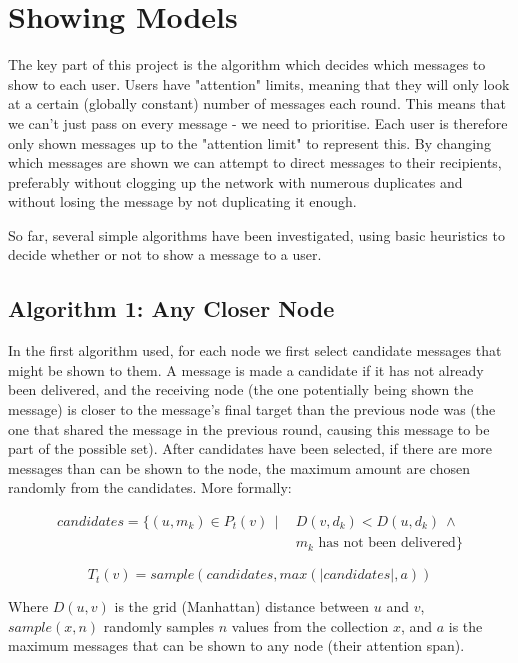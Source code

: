 \documentclass[bsc,frontabs,twoside,singlespacing,parskip,deptreport]{infthesis}     %
\begin{document}
\section{Showing Models}
The key part of this project is the algorithm which decides which messages to show to each user. Users have "attention" limits, meaning that they will only look at a certain (globally constant) number of messages each round. This means that we can't just pass on every message - we need to prioritise. Each user is therefore only shown messages up to the "attention limit" to represent this. By changing which messages are shown we can attempt to direct messages to their recipients, preferably without clogging up the network with numerous duplicates and without losing the message by not duplicating it enough.

So far, several simple algorithms have been investigated, using basic heuristics to decide whether or not to show a message to a user.

\subsection{Algorithm 1: Any Closer Node}
In the first algorithm used, for each node we first select candidate messages that might be shown to them. A message is made a candidate if it has not already been delivered, and the receiving node (the one potentially being shown the message) is closer to the message's final target than the previous node was (the one that shared the message in the previous round, causing this message to be part of the possible set). After candidates have been selected, if there are more messages than can be shown to the node, the maximum amount are chosen randomly from the candidates. More formally:

\begin{equation}
\begin{split}
candidates = \{ (u, m_{k}) \in P_{t}(v) \:\: | \:\: & D(v, d_{k}) < D(u, d_{k}) \: \wedge \\
& m_{k} \mbox{ has not been delivered} \}
\end{split}
\end{equation}

\begin{equation}
T_{t}(v) = sample(candidates, max(|candidates|, a))
\end{equation}

Where $D(u, v)$ is the grid (Manhattan) distance between $u$ and $v$, $sample(x, n)$ randomly samples $n$ values from the collection $x$, and $a$ is the maximum messages that can be shown to any node (their attention span).
\end{document}
